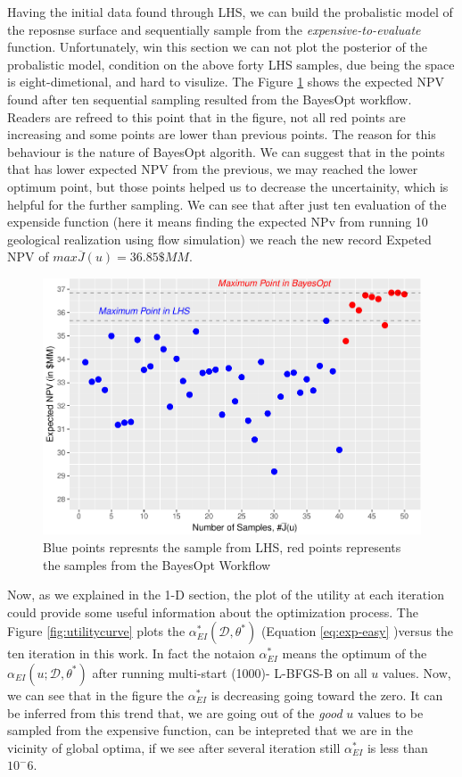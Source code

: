 \documentclass[]{elsarticle} %
\begin{document}
Having the initial data found through LHS, we can build the probalistic model of the reposnse surface and sequentially sample from the \emph{expensive-to-evaluate} function. Unfortunately, win this section we can not plot the posterior of the probalistic model, condition on the above forty LHS samples, due being the space is eight-dimetional, and hard to visulize. The Figure \ref{fig:lhsbayesop} shows the expected NPV found after ten sequential sampling resulted from the BayesOpt workflow. Readers are refreed to this point that in the figure, not all red points are increasing and some points are lower than previous points. The reason for this behaviour is the nature of BayesOpt algorith. We can suggest that in the points that has lower expected NPV from the previous, we may reached the lower optimum point, but those points helped us to decrease the uncertainity, which is helpful for the further sampling. We can see that after just ten evaluation of the expenside function (here it means finding the expected NPv from running 10 geological realization using flow simulation) we reach the new record Expeted NPV of \(max \overline{J}(u)=36.85\)\(\$MM\).

\begin{figure}

{\centering \includegraphics[width=468px]{0_Paper1_main_files/figure-latex/lhsbayesop-1} 

}

\caption{Blue points represnts the sample from LHS, red points represents the samples from the BayesOpt Workflow}\label{fig:lhsbayesop}
\end{figure}

Now, as we explained in the 1-D section, the plot of the utility at each iteration could provide some useful information about the optimization process. The Figure \ref{fig:utilitycurve} plots the \(\alpha_{EI}^*(\mathcal{D}, \theta^*)\) (Equation \eqref{eq:exp-easy} )versus the ten iteration in this work. In fact the notaion \(\alpha_{EI}^*\) means the optimum of the \(\alpha_{EI}(u;\mathcal{D},\theta^*)\) after running multi-start (1000)- L-BFGS-B on all \(u\) values. Now, we can see that in the figure the \(\alpha_{EI}^*\) is decreasing going toward the zero. It can be inferred from this trend that, we are going out of the \emph{good} \(u\) values to be sampled from the expensive function, can be intepreted that we are in the vicinity of global optima, if we see after several iteration still \(\alpha_{EI}^*\) is less than \(10^-6\).
\end{document}
